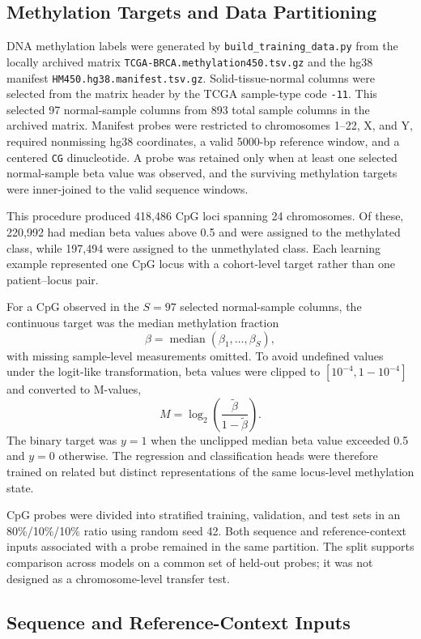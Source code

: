 \documentclass[10pt,letterpaper,twocolumn]{article}
\begin{document}
\subsection{Methylation Targets and Data Partitioning}
\label{sec:data}

DNA methylation labels were generated by
\texttt{build\_training\_data.py} from the locally archived matrix
\texttt{TCGA-BRCA.methylation450.tsv.gz} and the hg38 manifest
\texttt{HM450.hg38.manifest.tsv.gz}. Solid-tissue-normal columns were
selected from the matrix header by the TCGA sample-type code
\texttt{-11}. This selected 97 normal-sample columns from 893 total
sample columns in the archived matrix. Manifest probes were restricted
to chromosomes 1--22, X, and Y, required nonmissing hg38 coordinates, a
valid 5000-bp reference window, and a centered \texttt{CG}
dinucleotide.
A probe was retained only when at least one selected normal-sample beta
value was observed, and the surviving methylation targets were
inner-joined to the valid sequence windows.

This procedure produced 418,486 CpG loci spanning 24 chromosomes. Of
these, 220,992 had median beta values above 0.5 and were assigned to the
methylated class, while 197,494 were assigned to the unmethylated class.
Each learning example represented one CpG locus with a cohort-level
target rather than one patient--locus pair.

For a CpG observed in the $S=97$ selected normal-sample columns, the
continuous target was the median methylation fraction
\[
\beta=\operatorname{median}(\beta_1,\ldots,\beta_S),
\]
with missing sample-level measurements omitted. To avoid undefined
values under the logit-like transformation, beta values were clipped to
$[10^{-4},1-10^{-4}]$ and converted to M-values,
\[
M=\log_2\left(\frac{\widetilde\beta}
{1-\widetilde\beta}\right).
\]
The binary target was $y=1$ when the unclipped median beta value exceeded
0.5 and $y=0$ otherwise. The regression and classification heads were
therefore trained on related but distinct representations of the same
locus-level methylation state.

CpG probes were divided into stratified training, validation, and test
sets in an 80\%/10\%/10\% ratio using random seed 42. Both sequence and
reference-context inputs associated with a probe remained in the same
partition. The split supports comparison across models on a common set
of held-out probes; it was not designed as a chromosome-level transfer
test.

\subsection{Sequence and Reference-Context Inputs}
\end{document}
